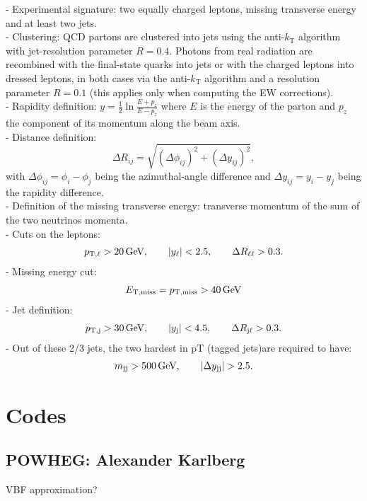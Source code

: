 \documentclass[a4paper,10pt]{report}
\begin{document}
%
- Experimental signature:
two equally charged leptons, missing transverse energy and at least two jets. \\
- Clustering: QCD partons are clustered into jets using the anti-$k_\text{T}$ algorithm  with jet-resolution parameter $R=0.4$.
Photons from real radiation are recombined with the final-state quarks into jets or with the charged leptons into dressed leptons, in both cases via the anti-$k_\text{T}$ algorithm and a resolution parameter $R=0.1$ 
(this applies only when computing the EW corrections). \\
%
- Rapidity definition: $y=\frac{1}{2}\ln \frac{E+p_z}{E-p_z}$ where $E$ is the energy of the parton and $p_z$ the component of its momentum along the beam axis. \\
%
- Distance definition:
\begin{equation}
        \Delta R_{ij} = \sqrt{(\Delta \phi_{ij})^2+(\Delta y_{ij})^2},
\end{equation}
with $\Delta \phi_{ij}=\phi_i-\phi_j$ being the azimuthal-angle difference and $\Delta y_{ij} = y_i-y_j$ being the rapidity difference. \\
%
- Definition of the missing transverse energy: transverse momentum of the sum of the two neutrinos momenta. \\
%
- Cuts on the leptons:
\begin{align}
 p_{\text{T},\ell} >  20\,\text{GeV},\qquad |y_{\ell}| < 2.5, \qquad \Delta R_{\ell\ell}> 0.3.
\end{align}
%
- Missing energy cut:
\begin{align}
  E_{\text{T},\text{miss}}=p_{\rm T, miss} >  40\,\text{GeV}
\end{align}
%
- Jet definition:
%
\begin{align}
 p_{\text{T},\text{j}} >  30\,\text{GeV}, \qquad |y_\text{j}| < 4.5,\qquad\Delta R_{\text{j}\ell} > 0.3 .
\end{align}
%
- Out of these 2/3 jets, the two hardest in pT (tagged jets)are required to have:
\begin{align}
 m_{\text{j} \text{j}} >  500\,\text{GeV},\qquad |\Delta y_{\text{j} \text{j}}| > 2.5.
\end{align}

\section{Codes}

\subsection{ {\sc POWHEG}: Alexander Karlberg}
VBF approximation? \\
\end{document}
